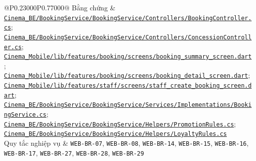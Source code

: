 \begin{longtable}{@{}P{0.23000\SRSWidth}P{0.77000\SRSWidth}@{}}
Bằng chứng & \href{../../../Cinema\_BE/BookingService/BookingService/Controllers/BookingController.cs}{\texttt{Cinema\_\allowbreak{}BE/\allowbreak{}Booking\allowbreak{}Service/\allowbreak{}Booking\allowbreak{}Service/\allowbreak{}Controll\allowbreak{}ers/\allowbreak{}Booking\allowbreak{}Controll\allowbreak{}er.\allowbreak{}cs}}; \href{../../../Cinema\_BE/BookingService/BookingService/Controllers/ConcessionController.cs}{\texttt{Cinema\_\allowbreak{}BE/\allowbreak{}Booking\allowbreak{}Service/\allowbreak{}Booking\allowbreak{}Service/\allowbreak{}Controll\allowbreak{}ers/\allowbreak{}Concessi\allowbreak{}on\allowbreak{}Controll\allowbreak{}er.\allowbreak{}cs}}; \href{../../../Cinema\_Mobile/lib/features/booking/screens/booking\_summary\_screen.dart}{\texttt{Cinema\_\allowbreak{}Mobile/\allowbreak{}lib/\allowbreak{}features\allowbreak{}/\allowbreak{}booking/\allowbreak{}screens/\allowbreak{}booking\_\allowbreak{}summary\_\allowbreak{}screen.\allowbreak{}dart}}; \href{../../../Cinema\_Mobile/lib/features/booking/screens/booking\_detail\_screen.dart}{\texttt{Cinema\_\allowbreak{}Mobile/\allowbreak{}lib/\allowbreak{}features\allowbreak{}/\allowbreak{}booking/\allowbreak{}screens/\allowbreak{}booking\_\allowbreak{}detail\_\allowbreak{}screen.\allowbreak{}dart}}; \href{../../../Cinema\_Mobile/lib/features/staff/screens/staff\_create\_booking\_screen.dart}{\texttt{Cinema\_\allowbreak{}Mobile/\allowbreak{}lib/\allowbreak{}features\allowbreak{}/\allowbreak{}staff/\allowbreak{}screens/\allowbreak{}staff\_\allowbreak{}create\_\allowbreak{}booking\_\allowbreak{}screen.\allowbreak{}dart}}; \href{../../../Cinema\_BE/BookingService/BookingService/Services/Implementations/BookingService.cs}{\texttt{Cinema\_\allowbreak{}BE/\allowbreak{}Booking\allowbreak{}Service/\allowbreak{}Booking\allowbreak{}Service/\allowbreak{}Services\allowbreak{}/\allowbreak{}Implemen\allowbreak{}tations/\allowbreak{}Booking\allowbreak{}Service.\allowbreak{}cs}}; \href{../../../Cinema\_BE/BookingService/BookingService/Helpers/PromotionRules.cs}{\texttt{Cinema\_\allowbreak{}BE/\allowbreak{}Booking\allowbreak{}Service/\allowbreak{}Booking\allowbreak{}Service/\allowbreak{}Helpers/\allowbreak{}Promotio\allowbreak{}n\allowbreak{}Rules.\allowbreak{}cs}}; \href{../../../Cinema\_BE/BookingService/BookingService/Helpers/LoyaltyRules.cs}{\texttt{Cinema\_\allowbreak{}BE/\allowbreak{}Booking\allowbreak{}Service/\allowbreak{}Booking\allowbreak{}Service/\allowbreak{}Helpers/\allowbreak{}Loyalty\allowbreak{}Rules.\allowbreak{}cs}} \\[3pt]
Quy tắc nghiệp vụ & \texttt{WEB-\allowbreak{}BR-\allowbreak{}07}, \texttt{WEB-\allowbreak{}BR-\allowbreak{}08}, \texttt{WEB-\allowbreak{}BR-\allowbreak{}14}, \texttt{WEB-\allowbreak{}BR-\allowbreak{}15}, \texttt{WEB-\allowbreak{}BR-\allowbreak{}16}, \texttt{WEB-\allowbreak{}BR-\allowbreak{}17}, \texttt{WEB-\allowbreak{}BR-\allowbreak{}27}, \texttt{WEB-\allowbreak{}BR-\allowbreak{}28}, \texttt{WEB-\allowbreak{}BR-\allowbreak{}29} \\[3pt]

\end{longtable}
